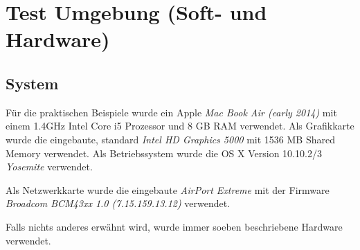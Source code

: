 \section{Test Umgebung (Soft- und Hardware)}
\label{sec:testEnvroiment}
\subsection{System}
Für die praktischen Beispiele wurde ein Apple \textit{Mac Book Air (early 2014)} mit einem 1.4GHz Intel Core i5 Prozessor und 8 GB RAM verwendet. Als Grafikkarte wurde die eingebaute, standard \textit{Intel HD Graphics 5000} mit 1536 MB Shared Memory verwendet.
Als Betriebssystem wurde die OS X Version 10.10.2/3 \textit{Yosemite} verwendet.

Als Netzwerkkarte wurde die eingebaute \textit{AirPort Extreme} mit der Firmware \textit{Broadcom BCM43xx 1.0 (7.15.159.13.12)} verwendet.

Falls nichts anderes erwähnt wird, wurde immer soeben beschriebene Hardware verwendet.
